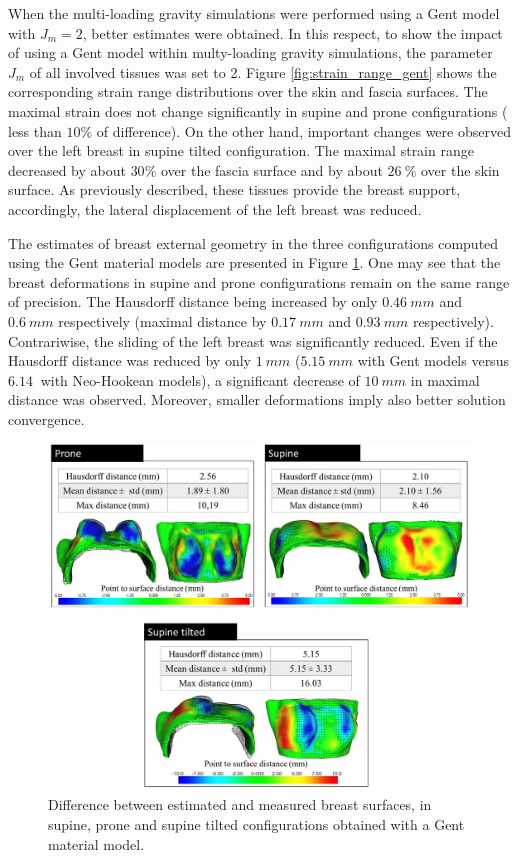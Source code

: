 When the multi-loading gravity simulations were performed using a Gent model with $J_m=2$, better estimates were obtained. In this respect, to show the impact of using a Gent model within multy-loading gravity simulations, the parameter $J_m$ of all involved tissues was set to 2. Figure \ref{fig:strain_range_gent} shows the corresponding strain range distributions over the skin and fascia surfaces.  The maximal strain does not change significantly in supine and prone configurations ( less than $10\%$ of difference). On the other hand, important changes were observed over the left breast in supine tilted configuration. The maximal strain range decreased by about $30\%$ over the fascia surface and by about $26 \ \%$ over the skin surface. As previously described, these tissues provide the breast support, accordingly,  the lateral displacement of the left breast was reduced.

 The estimates of breast external geometry in the three configurations computed using the Gent material models are presented in Figure \ref{fig:modelevaluation_gent}. One may see that the breast deformations in supine and prone configurations remain on the same range of precision. The Hausdorff distance being increased by only $0.46 \ mm$ and $0.6\ mm$ respectively (maximal distance by $0.17\ mm$ and $0.93 \ mm$ respectively). Contrariwise, the sliding of the left breast was significantly reduced. Even if the Hausdorff distance was reduced by only $1 \ mm $ ($5.15 \ mm$ with Gent models versus $6.14 \ $ with Neo-Hookean models), a significant decrease of $10 \ mm$ in maximal distance  was observed. Moreover, smaller deformations imply also better solution convergence. 
   

\begin{figure}[!h]
\centering
\includegraphics[width=\textwidth,keepaspectratio]{figures/modelevaluation_gent.jpg} 
\caption{Difference between estimated and measured breast surfaces, in supine, prone and supine tilted configurations obtained with a Gent material model. }\label{fig:modelevaluation_gent}
\end{figure}

